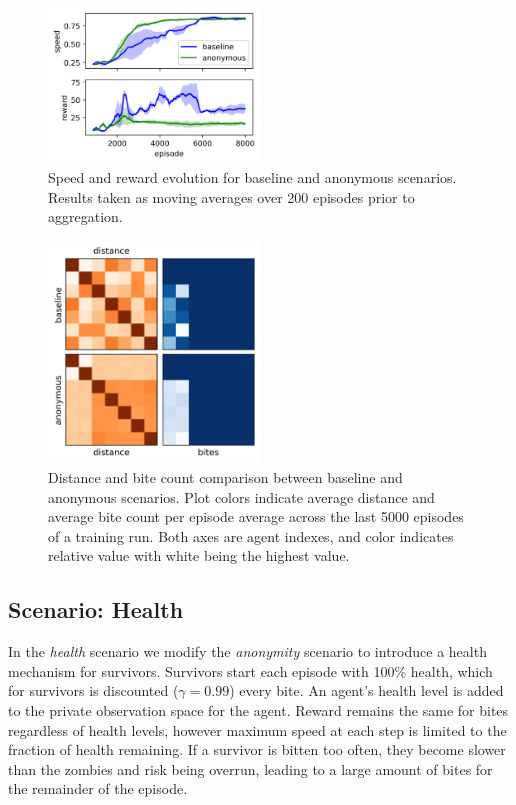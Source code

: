 \documentclass[11pt,a4paper]{article}
\begin{document}
\begin{figure}
  \centering
  \includegraphics[width=0.5\textwidth]{figures/anon_base_compare.png}
  \caption{
    Speed and reward evolution for baseline and anonymous scenarios.
    Results taken as moving averages over 200 episodes prior to aggregation.
  }
  \label{fig:anon_base_compare}
\end{figure}

\begin{figure}
  \centering
  \includegraphics[width=0.5\textwidth]{figures/anon_base_dist_bite.png}
  \caption{
    Distance and bite count comparison between baseline and anonymous scenarios.
    Plot colors indicate average distance and average bite count per episode average across the last 5000 episodes of a training run.
    Both axes are agent indexes, and color indicates relative value with white being the highest value.
  }
  \label{fig:anon_base_dist_bite}
\end{figure}

\subsection{Scenario: Health}
\label{sec:health}

In the \emph{health} scenario we modify the \emph{anonymity} scenario to introduce a health mechanism for survivors.
Survivors start each episode with 100\% health, which for survivors is discounted ($\gamma=0.99$) every bite.
An agent's health level is added to the private observation space for the agent.
Reward remains the same for bites regardless of health levels,
however maximum speed at each step is limited to the fraction of health remaining.
If a survivor is bitten too often, they become slower than the zombies and risk being overrun, leading to a large amount of bites for the remainder of the episode.
\end{document}
